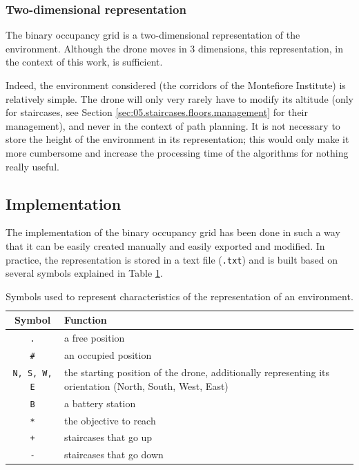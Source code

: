 \subsubsection{Two-dimensional representation}

The binary occupancy grid is a two-dimensional representation of the environment. Although the drone moves in 3 dimensions, this representation, in the context of this work, is sufficient.

Indeed, the environment considered (the corridors of the Montefiore Institute) is relatively simple. The drone will only very rarely have to modify its altitude (only for staircases, see Section \ref{sec:05.staircases.floors.management} for their management), and never in the context of path planning. It is not necessary to store the height of the environment in its representation; this would only make it more cumbersome and increase the processing time of the algorithms for nothing really useful.

\subsection{Implementation}

The implementation of the binary occupancy grid has been done in such a way that it can be easily created manually and easily exported and modified. In practice, the representation is stored in a text file (\texttt{.txt}) and is built based on several symbols explained in Table \ref{tab:05.environment.representation.symbols}.

\begin{table}[H]
    \centering
    \begin{tabular}{|c|p{10cm}|}
        \hline
        \textbf{Symbol} & \textbf{Function} \\ \hline
        \hline
        \texttt{.} & a free position \\ \hline
        \texttt{\#} & an occupied position \\ \hline
        \texttt{N, S, W, E} & the starting position of the drone, additionally representing its orientation (North, South, West, East) \\ \hline
        \texttt{B} & a battery station \\ \hline
        \texttt{*} & the objective to reach \\ \hline
        \texttt{+} & staircases that go up \\ \hline
        \texttt{-} & staircases that go down \\ \hline
    \end{tabular}
    \caption{Symbols used to represent characteristics of the representation of an environment.}
    \label{tab:05.environment.representation.symbols}
\end{table}

